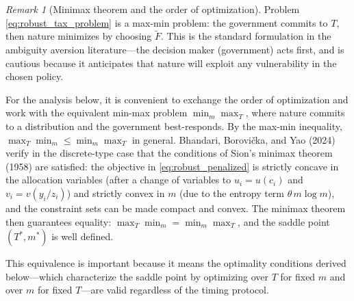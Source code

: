 \documentclass[12pt,a4paper]{article}
\theoremstyle{definition}
\theoremstyle{plain}
\theoremstyle{remark}
\newtheorem{remark}{Remark}[section]
\begin{document}
\begin{remark}[Minimax theorem and the order of optimization]
\label{rem:minimax}
Problem \eqref{eq:robust_tax_problem} is a max-min problem: the government commits to $T$, then nature minimizes by choosing $\widetilde{F}$. This is the standard formulation in the ambiguity aversion literature---the decision maker (government) acts first, and is cautious because it anticipates that nature will exploit any vulnerability in the chosen policy.

For the analysis below, it is convenient to exchange the order of optimization and work with the equivalent min-max problem $\min_m \max_T$, where nature commits to a distribution and the government best-responds. By the max-min inequality, $\max_T \min_m \leq \min_m \max_T$ in general. Bhandari, Borovi\v{c}ka, and Yao (2024) verify in the discrete-type case that the conditions of Sion's minimax theorem (1958) are satisfied: the objective in \eqref{eq:robust_penalized} is strictly concave in the allocation variables (after a change of variables to $u_i = u(c_i)$ and $v_i = v(y_i/z_i)$) and strictly convex in $m$ (due to the entropy term $\theta\,m\log m$), and the constraint sets can be made compact and convex. The minimax theorem then guarantees equality: $\max_T \min_m = \min_m \max_T$, and the saddle point $(T^*, m^*)$ is well defined.

This equivalence is important because it means the optimality conditions derived below---which characterize the saddle point by optimizing over $T$ for fixed $m$ and over $m$ for fixed $T$---are valid regardless of the timing protocol.
\end{remark}
\end{document}
